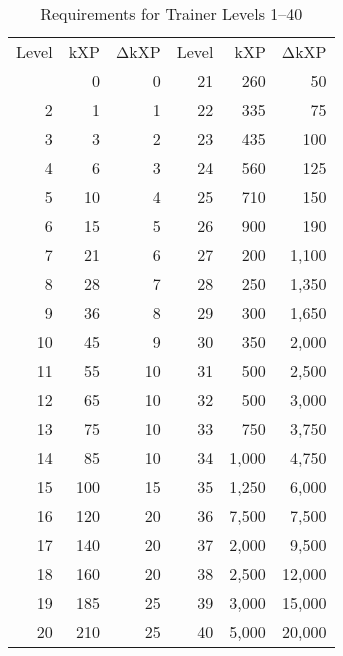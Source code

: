 \begin{table}[ht]
\begin{center}
\begin{tabular}{r r r|r r r}
  Level & kXP & ΔkXP & Level & kXP & ΔkXP \\
\Midrule
1 & 0 & 0 & 21 & 260 & 50 \\
2 & 1 & 1 & 22 & 335 & 75 \\
3 & 3 & 2 & 23 & 435 & 100 \\
4 & 6 & 3 & 24 & 560 & 125 \\
5 & 10 & 4 & 25 & 710 & 150 \\
6 & 15 & 5 & 26 & 900 & 190 \\
7 & 21 & 6 & 27 & 200 & 1,100 \\
8 & 28 & 7 & 28 & 250 & 1,350 \\
9 & 36 & 8 & 29 & 300 & 1,650 \\
10 & 45 & 9 & 30 & 350 & 2,000 \\
11 & 55 & 10 & 31 & 500 & 2,500 \\
12 & 65 & 10 & 32 & 500 & 3,000 \\
13 & 75 & 10 & 33 & 750 & 3,750 \\
14 & 85 & 10 & 34 & 1,000 & 4,750 \\
15 & 100 & 15 & 35 & 1,250 & 6,000 \\
16 & 120 & 20 & 36 & 7,500 & 7,500 \\
17 & 140 & 20 & 37 & 2,000 & 9,500 \\
18 & 160 & 20 & 38 & 2,500 & 12,000 \\
19 & 185 & 25 & 39 & 3,000 & 15,000 \\
20 & 210 & 25 & 40 & 5,000 & 20,000 \\
\end{tabular}
\caption{Requirements for Trainer Levels 1--40}
\label{table:xp40}
\end{center}
\end{table}

